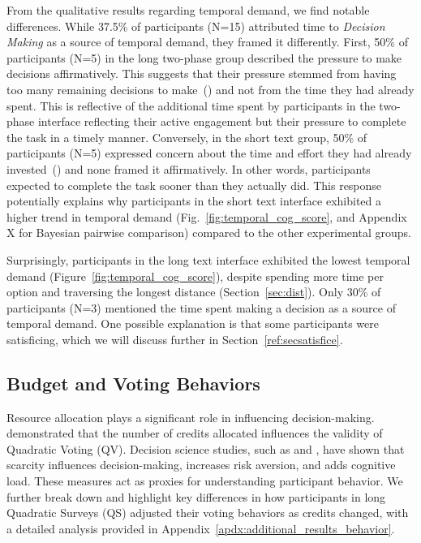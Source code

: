 From the qualitative results regarding temporal demand, we find notable differences. While 37.5\% of participants (N=15) attributed time to \textit{Decision Making} as a source of temporal demand, they framed it differently. First, 50\% of participants (N=5) in the long two-phase group described the pressure to make decisions affirmatively. This suggests that their pressure stemmed from having too many remaining decisions to make~() and not from the time they had already spent. This is reflective of the additional time spent by participants in the two-phase interface reflecting their active engagement but their pressure to complete the task in a timely manner. Conversely, in the short text group, 50\% of participants (N=5) expressed concern about the time and effort they had already invested~() and none framed it affirmatively. In other words, participants expected to complete the task sooner than they actually did. This response potentially explains why participants in the short text interface exhibited a higher trend in temporal demand (Fig.~\ref{fig:temporal_cog_score}, and Appendix X for Bayesian pairwise comparison) compared to the other experimental groups. 

Surprisingly, participants in the long text interface exhibited the lowest temporal demand (Figure~\ref{fig:temporal_cog_score}), despite spending more time per option and traversing the longest distance (Section~\ref{sec:dist}). Only 30\% of participants (N=3) mentioned the time spent making a decision as a source of temporal demand. One possible explanation is that some participants were satisficing, which we will discuss further in Section~\ref{ref:secsatisfice}.

\subsection{Budget and Voting Behaviors}
Resource allocation plays a significant role in influencing decision-making.\textcite{chengCanShowWhat2021} demonstrated that the number of credits allocated influences the validity of Quadratic Voting (QV). Decision science studies, such as \textcite{Shah2015a} and \cite{debruijnPovertyEconomicDecision2022}, have shown that scarcity influences decision-making, increases risk aversion, and adds cognitive load. These measures act as proxies for understanding participant behavior. We further break down and highlight key differences in how participants in long Quadratic Surveys (QS) adjusted their voting behaviors as credits changed, with a detailed analysis provided in Appendix~\ref{apdx:additional_results_behavior}.

